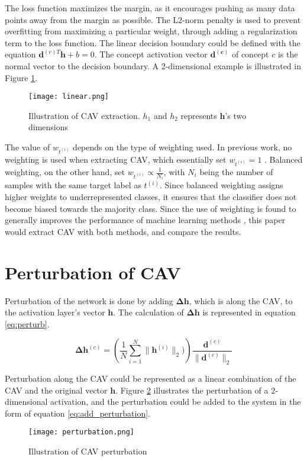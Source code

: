 The loss function maximizes the margin, as it encourages pushing as many data points away from the margin as possible. The L2-norm penalty is used to prevent overfitting from maximizing a particular weight, through adding a regularization term to the loss function. The linear decision boundary could be defined with the equation $\boldsymbol{d}^{(c)T}\boldsymbol{h} + b = 0$. The concept activation vector $\boldsymbol{d^{(c)}}$ of concept $c$ is the normal vector to the decision boundary. A 2-dimensional example is illustrated in Figure \ref{fig:linear}.

\begin{figure}[H]
    \centering
    \texttt{[image: linear.png]}
    \caption{Illustration of CAV extraction. $h_1$ and $h_2$ represents  $\boldsymbol{h}$'s two dimensions}
    \label{fig:linear}
\end{figure}

The value of $w_{t^{(i)}}$ depends on the type of weighting used. In previous work, no weighting is used when extracting CAV, which essentially set $w_{t^{(i)}} = 1$ \cite{feature_bias}. Balanced weighting, on the other hand, set $w_{t^{(i)}} \propto \frac{1}{N_{i}}$, with $N_i$ being the number of samples with the same target label as $t^{(i)}$. Since balanced weighting assigns higher weights to underrepresented classes, it ensures that the classifier does not become biased towards the majority class. Since the use of weighting is found to generally improves the performance of machine learning methods \cite{balanced}, this paper would extract CAV with both methods, and compare the results.

\section{Perturbation of CAV}

Perturbation of the network is done by adding $\boldsymbol{\Delta h}$, which is along the CAV, to the activation layer's vector $\boldsymbol{h}$. The calculation of $\boldsymbol{\Delta h}$ is represented in equation \ref{eq:perturb}.

\begin{equation} \label{eq:perturb}
    \boldsymbol{\Delta h}^{(c)} = \left(\frac{1}{N}\sum_{i=1}^{N} \|\boldsymbol{h}^{(i)}\|_{2}) \right) \frac{ \boldsymbol{d}^{(c)}}{\| \boldsymbol{d}^{(c)}\|_2}
\end{equation}

Perturbation along the CAV could be represented as a linear combination of the CAV and the original vector $\boldsymbol{h}$. Figure \ref{fig:perturbation} illustrates the perturbation of a 2-dimensional activation, and the perturbation could be added to the system in the form of equation \ref{eq:add_perturbation}.
\begin{figure}[H]
    \centering
    \texttt{[image: perturbation.png]}
    \caption{Illustration of CAV perturbation}
    \label{fig:perturbation}
\end{figure}

